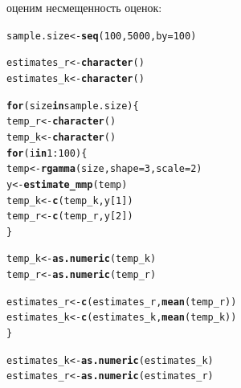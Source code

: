 \documentclass{article}\usepackage[]{graphicx}\usepackage[]{color}
\makeatletter
\newcommand{\hlnum}[1]{\textcolor[rgb]{0.686,0.059,0.569}{#1}}%
\newcommand{\hlopt}[1]{\textcolor[rgb]{0,0,0}{#1}}%
\newcommand{\hlstd}[1]{\textcolor[rgb]{0.345,0.345,0.345}{#1}}%
\newcommand{\hlkwa}[1]{\textcolor[rgb]{0.161,0.373,0.58}{\textbf{#1}}}%
\newcommand{\hlkwb}[1]{\textcolor[rgb]{0.69,0.353,0.396}{#1}}%
\newcommand{\hlkwc}[1]{\textcolor[rgb]{0.333,0.667,0.333}{#1}}%
\newcommand{\hlkwd}[1]{\textcolor[rgb]{0.737,0.353,0.396}{\textbf{#1}}}%
\newenvironment{kframe}{%
 \def\at@end@of@kframe{}%
 \ifinner\ifhmode%
  \def\at@end@of@kframe{\end{minipage}}%
  \begin{minipage}{\columnwidth}%
 \fi\fi%
 \def\FrameCommand##1{\hskip\@totalleftmargin \hskip-\fboxsep
 \colorbox{shadecolor}{##1}\hskip-\fboxsep
     \hskip-\linewidth \hskip-\@totalleftmargin \hskip\columnwidth}%
 \MakeFramed {\advance\hsize-\width
   \@totalleftmargin\z@ \linewidth\hsize
   \@setminipage}}%
 {\par\unskip\endMakeFramed%
 \at@end@of@kframe}
\newenvironment{knitrout}{}{} %
\makeatother
\begin{document}
оценим несмещенность оценок:

\begin{knitrout}
\color{fgcolor}\begin{kframe}
\begin{alltt}
\hlstd{sample.size} \hlkwb{<-} \hlkwd{seq}\hlstd{(}\hlnum{100}\hlstd{,} \hlnum{5000}\hlstd{,} \hlkwc{by} \hlstd{=} \hlnum{100}\hlstd{)}

\hlstd{estimates_r} \hlkwb{<-} \hlkwd{character}\hlstd{()}
\hlstd{estimates_k} \hlkwb{<-} \hlkwd{character}\hlstd{()}

\hlkwa{for} \hlstd{(size} \hlkwa{in} \hlstd{sample.size) \{}
  \hlstd{temp_r} \hlkwb{<-} \hlkwd{character}\hlstd{()}
  \hlstd{temp_k} \hlkwb{<-} \hlkwd{character}\hlstd{()}
  \hlkwa{for} \hlstd{(i} \hlkwa{in} \hlnum{1}\hlopt{:}\hlnum{100}\hlstd{) \{}
    \hlstd{temp} \hlkwb{<-} \hlkwd{rgamma}\hlstd{(size,} \hlkwc{shape} \hlstd{=} \hlnum{3}\hlstd{,} \hlkwc{scale} \hlstd{=} \hlnum{2}\hlstd{)}
    \hlstd{y} \hlkwb{<-} \hlkwd{estimate_mmp}\hlstd{(temp)}
    \hlstd{temp_k} \hlkwb{<-} \hlkwd{c}\hlstd{(temp_k, y[}\hlnum{1}\hlstd{])}
    \hlstd{temp_r} \hlkwb{<-} \hlkwd{c}\hlstd{(temp_r, y[}\hlnum{2}\hlstd{])}
  \hlstd{\}}

  \hlstd{temp_k} \hlkwb{<-} \hlkwd{as.numeric}\hlstd{(temp_k)}
  \hlstd{temp_r} \hlkwb{<-} \hlkwd{as.numeric}\hlstd{(temp_r)}

  \hlstd{estimates_r} \hlkwb{<-} \hlkwd{c}\hlstd{(estimates_r,} \hlkwd{mean}\hlstd{(temp_r))}
  \hlstd{estimates_k} \hlkwb{<-} \hlkwd{c}\hlstd{(estimates_k,} \hlkwd{mean}\hlstd{(temp_k))}
\hlstd{\}}

\hlstd{estimates_k} \hlkwb{<-} \hlkwd{as.numeric}\hlstd{(estimates_k)}
\hlstd{estimates_r} \hlkwb{<-} \hlkwd{as.numeric}\hlstd{(estimates_r)}


\end{alltt}
\end{kframe}
\end{knitrout}
\end{document}
